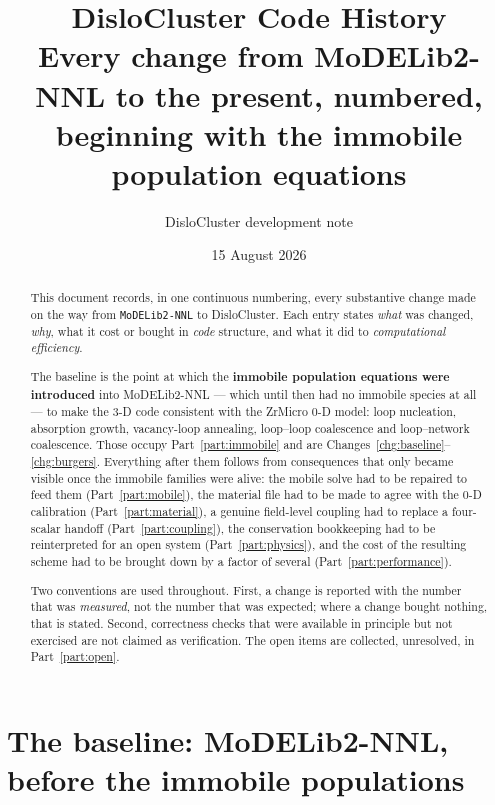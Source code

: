 \documentclass[11pt,a4paper]{article}
\title{\bfseries DisloCluster Code History\\[2mm]
       \large Every change from MoDELib2-NNL to the present, numbered,\\
       beginning with the immobile population equations}
\author{DisloCluster development note}
\date{15 August 2026}
\newcommand{\code}[1]{\texttt{\small #1}}
\newcounter{chg}
\begin{document}
\sloppy
\maketitle

\begin{abstract}
\noindent
This document records, in one continuous numbering, every substantive change
made on the way from \code{MoDELib2-NNL} to DisloCluster. Each entry states
\emph{what} was changed, \emph{why}, what it cost or bought in \emph{code}
structure, and what it did to \emph{computational efficiency}.

The baseline is the point at which the \textbf{immobile population equations
were introduced} into MoDELib2-NNL --- which until then had no immobile
species at all --- to make the 3-D code consistent with the ZrMicro 0-D model:
loop nucleation, absorption growth, vacancy-loop annealing, loop--loop
coalescence and loop--network coalescence. Those occupy
Part~\ref{part:immobile} and are Changes~\ref{chg:baseline}--\ref{chg:burgers}.
Everything after them follows from consequences that only became visible once
the immobile families were alive: the mobile solve had to be repaired to feed
them (Part~\ref{part:mobile}), the material file had to be made to agree with
the 0-D calibration (Part~\ref{part:material}), a genuine field-level coupling
had to replace a four-scalar handoff (Part~\ref{part:coupling}), the
conservation bookkeeping had to be reinterpreted for an open system
(Part~\ref{part:physics}), and the cost of the resulting scheme had to be
brought down by a factor of several (Part~\ref{part:performance}).

Two conventions are used throughout. First, a change is reported with the
number that was \emph{measured}, not the number that was expected; where a
change bought nothing, that is stated. Second, correctness checks that were
available in principle but not exercised are not claimed as verification.
The open items are collected, unresolved, in Part~\ref{part:open}.
\end{abstract}

\tableofcontents
\newpage

\section{The baseline: MoDELib2-NNL, before the immobile populations}
\end{document}
